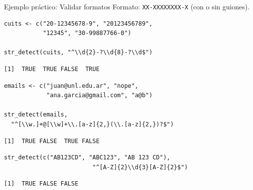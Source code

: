 \documentclass[8pt]{beamer}
\begin{document}
\begin{frame}[fragile]{Ejemplo práctico: Validar formatos}
	Formato: \texttt{XX-XXXXXXXX-X} (con o sin guiones).
\begin{lstlisting}[style=RScript]
cuits <- c("20-12345678-9", "20123456789",
           "12345", "30-99887766-0")

str_detect(cuits, "^\\d{2}-?\\d{8}-?\\d$")
\end{lstlisting}
\begin{lstlisting}[style=RConsole]
[1]  TRUE  TRUE FALSE  TRUE
\end{lstlisting}

\begin{lstlisting}[style=RScript]
emails <- c("juan@unl.edu.ar", "nope",
            "ana.garcia@gmail.com", "a@b")

str_detect(emails,
  "^[\\w.]+@[\\w]+\\.[a-z]{2,}(\\.[a-z]{2,})?$")
\end{lstlisting}
\begin{lstlisting}[style=RConsole]
[1]  TRUE FALSE  TRUE FALSE
\end{lstlisting}
\end{frame}





\begin{frame}[fragile]
\begin{lstlisting}[style=RScript]
str_detect(c("AB123CD", "ABC123", "AB 123 CD"),
						 "^[A-Z]{2}\\d{3}[A-Z]{2}$")
\end{lstlisting}
\begin{lstlisting}[style=RConsole]
[1]  TRUE FALSE FALSE
\end{lstlisting}
\end{frame}
\end{document}
